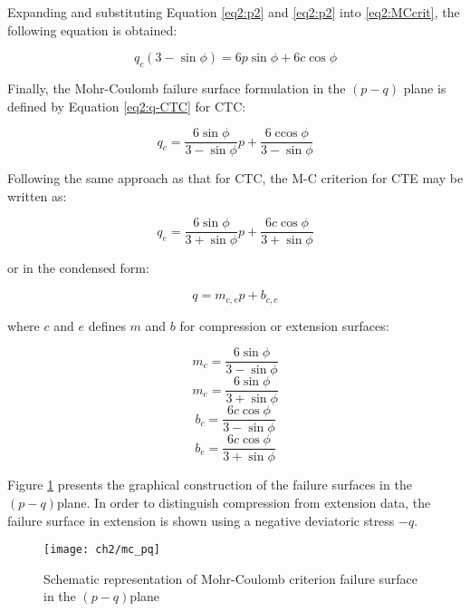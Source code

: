 Expanding and substituting Equation \ref{eq2:p2} and \ref{eq2:p2} into \ref{eq2:MCcrit}, the following equation is obtained:

\begin{equation}
    q_c(3-\sin \phi) = 6p \sin \phi + 6 c\cos \phi
\end{equation}

Finally, the Mohr-Coulomb failure surface formulation in the $(p-q)$ plane is defined by Equation \ref{eq2:q-CTC} for CTC:

\begin{equation}\label{eq2:q-CTC}
    q_c=\frac{6 \sin \phi}{3-\sin \phi} p+\frac{6 \operatorname{ccos} \phi}{3-\sin \phi} 
\end{equation}

Following the same approach as that for CTC, the M-C criterion for CTE may be written as:

\begin{equation}\label{eq2:q-CTE}
    q_e=\frac{6 \sin \phi}{3+\sin \phi} p+\frac{6 c \cos \phi}{3+\sin \phi}
\end{equation}

or in the condensed form: 

\begin{equation}\label{MC_q}
    q = m_{c,e} p + b_{c,e}
\end{equation}

where $c$ and $e$  defines $m$ and $b$ for compression or extension surfaces:

\begin{equation}\label{eq2:MC_mc_q}
    m_c=\frac{6 \sin \phi}{3-\sin \phi} 
\end{equation}
\begin{equation}\label{eq2:MC_me_q}
    m_e=\frac{6 \sin \phi}{3+\sin \phi} 
\end{equation}
\begin{equation}\label{eq2:MC_bc_q}
    b_c=\frac{6 c \cos \phi}{3-\sin \phi}
\end{equation}
\begin{equation}\label{eq2:MC_be_q}
    b_e=\frac{6 c \cos \phi}{3+\sin \phi}
\end{equation}

Figure \ref{fig2:mc_pq} presents the graphical construction of the failure surfaces in the  $(p-q)$plane. In order to distinguish compression from extension data, the failure surface in extension is shown using a negative deviatoric stress $-q$. 

\begin{figure}[tb]
    \centering
    \texttt{[image: ch2/mc\_pq]}
    \caption{Schematic representation of Mohr-Coulomb criterion failure surface in the $(p-q)$plane}
    \label{fig2:mc_pq}
\end{figure} 

